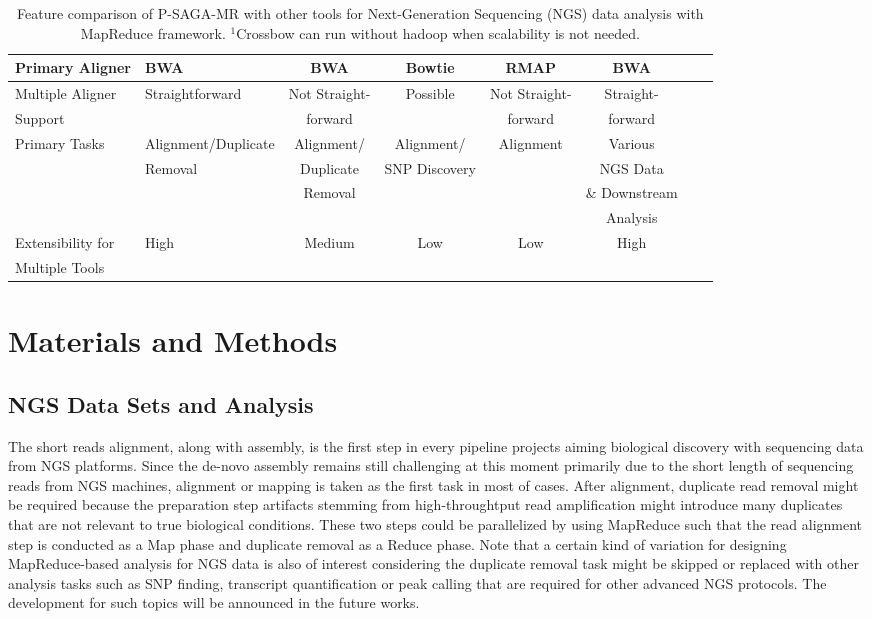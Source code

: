 \documentclass{sig-alternate}
\begin{document}
\begin{center}
\begin{table}[ht]
{\begin{tabular}{|l|l|c|c|c|c|c|c|}
Primary Aligner &  BWA  &  BWA & Bowtie & RMAP &  BWA \\ \hline
Multiple Aligner  & Straightforward & Not Straight- & Possible & Not Straight-  & Straight-  \\ 
Support &  & forward &   & forward  & forward \\\hline
Primary Tasks & Alignment/Duplicate  & Alignment/ & Alignment/ & Alignment &Various\\
  &  Removal & Duplicate & SNP Discovery & & NGS Data  \\  
           &  &  Removal & &  & \& Downstream  \\
           &  & & &  & Analysis \\ \hline  
Extensibility for   &  High  & Medium &  Low & Low & High      \\
Multiple Tools  &      &  &  &  &   \\ \hline

\hline
\end{tabular}}
\hfill{}
\caption{Feature comparison of P-SAGA-MR with other tools for Next-Generation Sequencing (NGS) data analysis with MapReduce framework.  $^{1}${Crossbow can run without hadoop when scalability is not needed.} }
 \label{table:mr-comparison}
\end{table}
\end{center}

\section{Materials and Methods}
\subsection{NGS Data Sets and Analysis}
The short reads alignment, along with assembly, is the first step in every pipeline projects aiming biological discovery with sequencing data from NGS platforms.  Since the de-novo assembly remains still challenging at this moment primarily due to the short length of sequencing reads from NGS machines, alignment or mapping is taken as the first task in most of cases.  After alignment, duplicate read removal might be required because the preparation step artifacts stemming from high-throughtput read amplification might introduce many duplicates that are not relevant to true biological conditions.  These two steps could be parallelized by using MapReduce such that the read alignment step is conducted as a Map phase and duplicate removal as a Reduce phase.  Note that a certain kind of variation for designing MapReduce-based analysis for NGS data is also of interest considering the duplicate removal task might be skipped or replaced with other analysis tasks such as SNP finding, transcript quantification or peak calling that are required for other advanced NGS protocols.  The development for such topics will be announced in the future works.
\end{document}
